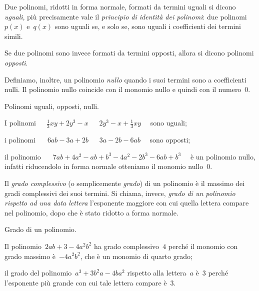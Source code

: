 \begin{definizione}
Due polinomi, ridotti in forma normale, formati da termini uguali si dicono 
\emph{uguali}, più precisamente vale il \emph{principio di identità dei 
polinomi}:
due polinomi~$p(x)$ e~$q(x)$ sono uguali se, e solo se, sono uguali
i coefficienti dei termini simili.

Se due polinomi sono invece formati da termini opposti, allora si dicono 
polinomi \emph{opposti}.

Definiamo, inoltre, un polinomio \emph{nullo} quando i suoi termini sono a 
coefficienti nulli. Il polinomio nullo
coincide con il monomio nullo e quindi con il numero~0.
\end{definizione}

\begin{exrig}
\begin{esempio}
Polinomi uguali, opposti, nulli.
\begin{enumeratea}
\item I polinomi~$\quad \frac{1}{3}xy+2y^3-x$ $\quad~2y^3-x+\frac{1}{3}xy 
\quad$ sono uguali;
\item i polinomi~$\quad~6ab-3a+2b$ $\quad~3a-2b-6ab \quad$ sono opposti;
\item il polinomio~$\quad~7ab+4a^2-ab+b^3-4a^2-2b^3-6ab+b^3 \quad$ è un 
polinomio nullo, infatti riducendolo in forma normale otteniamo il monomio 
nullo~$0$.
\end{enumeratea}
\end{esempio}
\end{exrig}

\begin{definizione}
Il \emph{grado complessivo} (o semplicemente \emph{grado}) di un polinomio 
è il massimo dei gradi complessivi dei suoi
termini. Si chiama, invece, \emph{grado di un polinomio rispetto ad una 
data lettera} l'esponente maggiore con
cui quella lettera compare nel polinomio, dopo che è stato ridotto a forma 
normale.
\end{definizione}

\begin{exrig}
\begin{esempio} Grado di un polinomio.
\begin{itemize*}
\item Il polinomio~$2ab+3-4a^2b^2$ ha grado complessivo~$4$ perché il 
monomio con grado massimo è~$-4a^2b^2 $, che è un monomio di quarto grado;
\item il grado del polinomio~$a^3+3b^2a-4ba^2$ rispetto alla lettera~$a$ 
è~$3$ perché l'esponente più grande con cui tale lettera compare è~$3$.
\end{itemize*}
\end{esempio}
\end{exrig}

